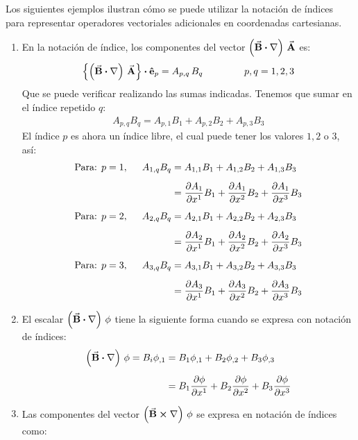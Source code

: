 \documentclass[hidelinks,12pt]{article}
\begin{document}
Los siguientes ejemplos ilustran cómo se puede utilizar la notación de índices para representar operadores vectoriales adicionales en coordenadas cartesianas.

\begin{enumerate}
\item En la notación de índice, los componentes del vector $\left( \va{B} \vdot \nabla \right) \, \va{A}$ es:
\begin{align*}
\left\{ \left( \va{B} \vdot \nabla \right) \, \va{A} \right\} \vdot \vu{e}_{p} = A_{p,q} \, B_{q} \hspace{1.5cm} p, q = 1, 2, 3
\end{align*}
Que se puede verificar realizando las sumas indicadas. Tenemos que sumar en el índice repetido $q$:
\begin{align*}
A_{p,q} B_{q} = A_{p,1} B_{1} + A_{p,2} B_{2} + A_{p,3} B_{3}
\end{align*}
El índice $p$ es ahora un índice libre, el cual puede tener los valores $1, 2$ o $3$, así:
\begin{align*}
\text{Para: } p = 1, \hspace{0.5cm} A_{1, q} B_{q} &= A_{1,1} B_{1} + A_{1,2} B_{2} + A_{1,3} B_{3} \\[0.5em]
&=\pdv{A_{1}}{x^{1}} B_{1} + \pdv{A_{1}}{x^{2}} B_{2} + \pdv{A_{1}}{x^{3}} B_{3} \\[0.5em]
\text{Para: } p = 2, \hspace{0.5cm} A_{2, q} B_{q} &= A_{2,1} B_{1} + A_{2,2} B_{2} + A_{2,3} B_{3} \\[0.5em]
&=\pdv{A_{2}}{x^{1}} B_{1} + \pdv{A_{2}}{x^{2}} B_{2} + \pdv{A_{2}}{x^{3}} B_{3} \\[0.5em]
\text{Para: } p = 3, \hspace{0.5cm} A_{3, q} B_{q} &= A_{3,1} B_{1} + A_{3,2} B_{2} + A_{3,3} B_{3} \\[0.5em]
&=\pdv{A_{3}}{x^{1}} B_{1} + \pdv{A_{3}}{x^{2}} B_{2} + \pdv{A_{3}}{x^{3}} B_{3}
\end{align*}
\item El escalar $\left( \va{B} \vdot \nabla \right) \, \phi$ tiene la siguiente forma cuando se expresa con notación de índices:
\begin{align*}
\left( \va{B} \vdot \nabla \right) \, \phi = B_{i} \phi_{,1} &= B_{1} \phi_{,1} + B_{2} \phi_{,2} + B_{3} \phi_{,3} \\[0.5em]
&= B_{1} \pdv{\phi}{x^{1}} + B_{2} \pdv{\phi}{x^{2}} + B_{3} \pdv{\phi}{x^{3}}
\end{align*}
\item Las componentes del vector $\left( \va{B} \cross \nabla \right) \, \phi$ se expresa en notación de índices como:

\end{enumerate}
\end{document}
